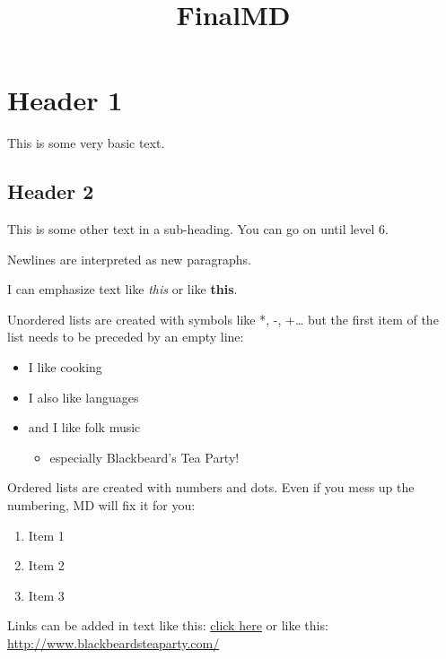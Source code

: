 \documentclass[a4paper]{article}
\title{FinalMD}
\providecommand{\tightlist}{%
\setlength{\itemsep}{0pt}\setlength{\parskip}{0pt}}
\begin{document}
  \maketitle
  \section{Header 1}\label{header-1}
  
  This is some very basic text.
  
  \subsection{Header 2}\label{header-2}
  
  This is some other text in a sub-heading. You can go on until level 6.
  
  Newlines are interpreted as new paragraphs.
  
  I can emphasize text like \emph{this} or like \textbf{this}.
  
  Unordered lists are created with symbols like *, -, +\ldots{} but the
  first item of the list needs to be preceded by an empty line:
  
  \begin{itemize}
  \tightlist
  \item
    I like cooking
  \item
    I also like languages
  \item
    and I like folk music
  
    \begin{itemize}
    \tightlist
    \item
      especially Blackbeard's Tea Party!
    \end{itemize}
  \end{itemize}
  
  Ordered lists are created with numbers and dots. Even if you mess up the
  numbering, MD will fix it for you:
  
  \begin{enumerate}
  \def\labelenumi{\arabic{enumi}.}
  \tightlist
  \item
    Item 1
  \item
    Item 2
  \item
    Item 3
  \end{enumerate}
  
  Links can be added in text like this:
  \href{http://www.blackbeardsteaparty.com/}{click here} or like this:
  \url{http://www.blackbeardsteaparty.com/}
  
\end{document}

